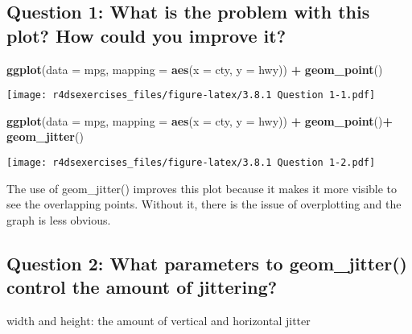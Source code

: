 \documentclass[
]{book}
\newenvironment{Shaded}{\begin{snugshade}}{\end{snugshade}}
\newcommand{\DataTypeTok}[1]{\textcolor[rgb]{0.13,0.29,0.53}{#1}}
\newcommand{\KeywordTok}[1]{\textcolor[rgb]{0.13,0.29,0.53}{\textbf{#1}}}
\newcommand{\NormalTok}[1]{#1}
\newcommand{\OperatorTok}[1]{\textcolor[rgb]{0.81,0.36,0.00}{\textbf{#1}}}
\newcommand{\StringTok}[1]{\textcolor[rgb]{0.31,0.60,0.02}{#1}}
\begin{document}
\hypertarget{question-1-what-is-the-problem-with-this-plot-how-could-you-improve-it}{%
\subsection{Question 1: What is the problem with this plot? How could you improve it?}\label{question-1-what-is-the-problem-with-this-plot-how-could-you-improve-it}}

\begin{Shaded}
\begin{Highlighting}[]
\KeywordTok{ggplot}\NormalTok{(}\DataTypeTok{data =}\NormalTok{ mpg, }\DataTypeTok{mapping =} \KeywordTok{aes}\NormalTok{(}\DataTypeTok{x =}\NormalTok{ cty, }\DataTypeTok{y =}\NormalTok{ hwy)) }\OperatorTok{+}\StringTok{ }
\StringTok{  }\KeywordTok{geom_point}\NormalTok{()}
\end{Highlighting}
\end{Shaded}

\texttt{[image: r4dsexercises\_files/figure-latex/3.8.1 Question 1-1.pdf]}

\begin{Shaded}
\begin{Highlighting}[]
\KeywordTok{ggplot}\NormalTok{(}\DataTypeTok{data =}\NormalTok{ mpg, }\DataTypeTok{mapping =} \KeywordTok{aes}\NormalTok{(}\DataTypeTok{x =}\NormalTok{ cty, }\DataTypeTok{y =}\NormalTok{ hwy)) }\OperatorTok{+}\StringTok{ }
\StringTok{  }\KeywordTok{geom_point}\NormalTok{()}\OperatorTok{+}
\StringTok{  }\KeywordTok{geom_jitter}\NormalTok{()}
\end{Highlighting}
\end{Shaded}

\texttt{[image: r4dsexercises\_files/figure-latex/3.8.1 Question 1-2.pdf]}

The use of geom\_jitter() improves this plot because it makes it more visible to see the overlapping points. Without it, there is the issue of overplotting and the graph is less obvious.

\hypertarget{question-2-what-parameters-to-geom_jitter-control-the-amount-of-jittering}{%
\subsection{Question 2: What parameters to geom\_jitter() control the amount of jittering?}\label{question-2-what-parameters-to-geom_jitter-control-the-amount-of-jittering}}

width and height: the amount of vertical and horizontal jitter
\end{document}
